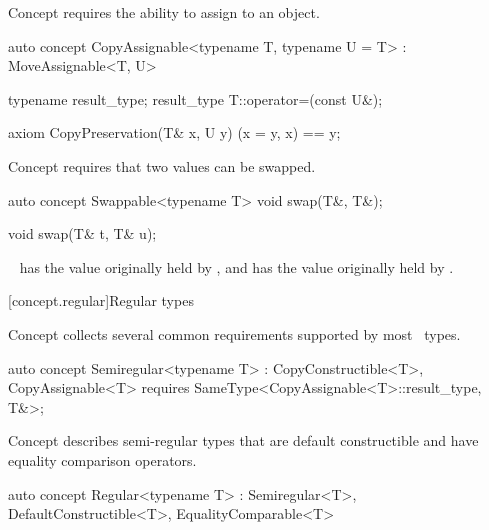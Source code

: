 \documentclass[american,twoside]{book}
\begin{document}
\pnum
Concept  requires the ability to assign to an
object.

\begin{itemdecl}
auto concept CopyAssignable<typename T, typename U = T> : MoveAssignable<T, U> {
  typename result_type;
  result_type T::operator=(const U&);

  axiom CopyPreservation(T& x, U y) {
    (x = y, x) == y;
  }
}
\end{itemdecl}


\pnum
Concept  requires that two values can be swapped.

\begin{itemdecl}
auto concept Swappable<typename T> {
  void swap(T&, T&);
}
\end{itemdecl}

\begin{itemdecl}
void swap(T& t, T& u);
\end{itemdecl}

\begin{itemdescr}
\pnum
\postconditions\
 has the value originally held by , and 
has the value originally held by \tcode{t}.
\end{itemdescr}

[concept.regular]{Regular types}

\pnum 
Concept  collects several common
requirements supported by most \Cpp\ types.

\begin{itemdecl}
auto concept Semiregular<typename T> : CopyConstructible<T>, CopyAssignable<T> { 
  requires SameType<CopyAssignable<T>::result_type, T&>;
}
\end{itemdecl}

\pnum
Concept  describes semi-regular types that are default
constructible and have equality comparison operators.

\begin{itemdecl}
auto concept Regular<typename T> : Semiregular<T>, DefaultConstructible<T>, EqualityComparable<T> { }
\end{itemdecl}
\end{document}
